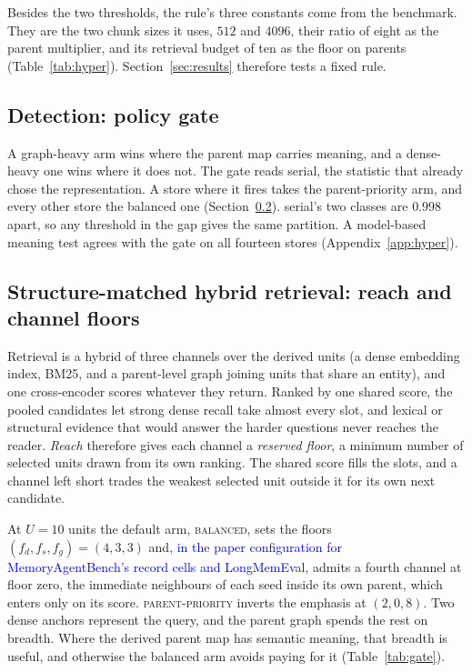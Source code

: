 \documentclass{article}
\newcommand{\nativechange}[1]{\textcolor{blue}{#1}}
\newcommand{\serial}{\textsf{serial}}
\newcommand{\balanced}{\textsc{balanced}}
\newcommand{\parprio}{\textsc{parent-priority}}
\begin{document}
Besides the two thresholds, the rule's three constants come from the benchmark. They are the two chunk sizes it uses, $512$ and $4096$, their ratio of eight as the parent multiplier, and its retrieval budget of ten as the floor on parents (Table~\ref{tab:hyper}). Section~\ref{sec:results} therefore tests a fixed rule.

\subsection{Detection: policy gate}\label{sec:gate}

A graph-heavy arm wins where the parent map
carries meaning, and a dense-heavy one wins where it does not. The gate reads \serial{}, the statistic that
already chose the representation. A store where it fires takes the parent-priority arm, and every other store
the balanced one (Section~\ref{sec:read}). \serial{}'s two classes are $0.998$ apart, so any threshold in the gap gives the same partition. A model-based meaning test agrees with the gate on all fourteen stores (Appendix~\ref{app:hyper}).

\subsection{Structure-matched hybrid retrieval: reach and channel floors}\label{sec:read}

Retrieval is a hybrid of three channels over the derived units (a dense embedding index, BM25, and a parent-level graph joining
units that share an entity), and one cross-encoder scores whatever they
return. Ranked by one shared score, the pooled candidates
let strong dense recall take almost every slot, and lexical or structural evidence that would answer the
harder questions never reaches the reader. \emph{Reach} therefore gives each channel a \emph{reserved floor}, a minimum number of selected units drawn from its own ranking. The shared score fills the slots, and a channel left short trades the weakest selected unit outside it for its own next candidate.

At $U{=}10$ units the default arm, \balanced{}, sets the floors $(f_d,f_s,f_g)=(4,3,3)$ and\nativechange{, in the paper configuration for MemoryAgentBench's record cells and LongMemEval,} admits a fourth channel at floor zero, the immediate neighbours of each seed inside its own parent, which enters only on its score. \parprio{} inverts the emphasis at $(2,0,8)$. Two dense anchors represent the query, and the parent graph spends the rest on breadth. Where the derived parent map has semantic meaning, that breadth is useful, and otherwise the balanced arm avoids paying for it (Table~\ref{tab:gate}).
\end{document}
